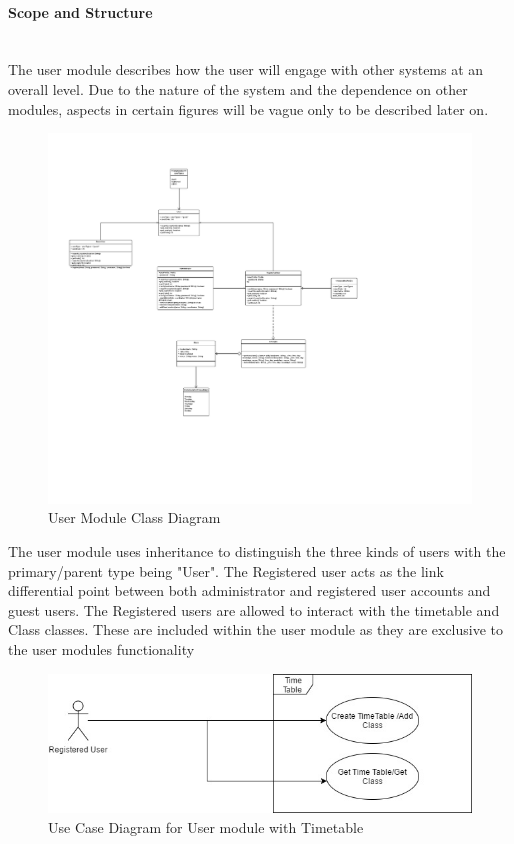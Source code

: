 \documentclass{article}
\begin{document}
		\paragraph{Scope and Structure}\mbox{} \\
		The user module describes how the user will engage with other systems at an overall level. Due to the nature of the system and the dependence on other modules, aspects in certain figures will be vague only to be described later on.
		\begin{figure}[h]
			\includegraphics[width=\textwidth]{./Images/User_class_diagram_finished.png}
			\caption{User Module Class Diagram} 
		\end{figure}
		{The user module uses inheritance to distinguish the three kinds of users with the primary/parent type being "User". The Registered user acts as the link differential point between both administrator and registered user accounts and guest users. The Registered users are allowed to interact with the timetable and Class classes. These are included within the user module as they are exclusive to the user modules functionality}
		
		
	
		\begin{figure}[h]
			\includegraphics[width=\textwidth]{./Images/User_Use_Case_Diagrams_TimeTable.jpg}
			\caption{Use Case Diagram for User module with Timetable }
		\end{figure}
	
\end{document}
